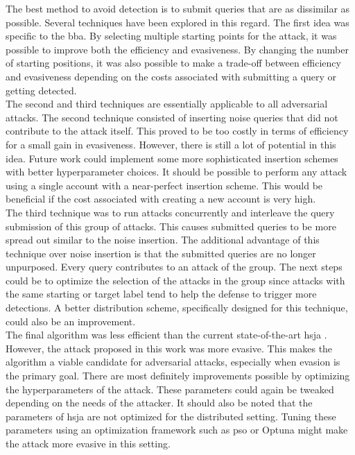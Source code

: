 The best method to avoid detection is to submit queries that are as dissimilar as possible. Several techniques have been explored in this regard. The first idea was specific to the \gls{bba}. By selecting multiple starting points for the attack, it was possible to improve both the efficiency and evasiveness. By changing the number of starting positions, it was also possible to make a trade-off between efficiency and evasiveness depending on the costs associated with submitting a query or getting detected.\\

The second and third techniques are essentially applicable to all adversarial attacks. The second technique consisted of inserting noise queries that did not contribute to the attack itself. This proved to be too costly in terms of efficiency for a small gain in evasiveness. However, there is still a lot of potential in this idea. Future work could implement some more sophisticated insertion schemes with better hyperparameter choices. It should be possible to perform any attack using a single account with a near-perfect insertion scheme. This would be beneficial if the cost associated with creating a new account is very high.\\

The third technique was to run attacks concurrently and interleave the query submission of this group of attacks. This causes submitted queries to be more spread out similar to the noise insertion. The additional advantage of this technique over noise insertion is that the submitted queries are no longer unpurposed. Every query contributes to an attack of the group. The next steps could be to optimize the selection of the attacks in the group since attacks with the same starting or target label tend to help the defense to trigger more detections. A better distribution scheme, specifically designed for this technique, could also be an improvement.\\

The final algorithm was less efficient than the current state-of-the-art \gls{hsja} \cite{hsja}. However, the attack proposed in this work was more evasive. This makes the algorithm a viable candidate for adversarial attacks, especially when evasion is the primary goal. There are most definitely improvements possible by optimizing the hyperparameters of the attack. These parameters could again be tweaked depending on the needs of the attacker. It should also be noted that the parameters of \gls{hsja} are not optimized for the distributed setting. Tuning these parameters using an optimization framework such as \gls{pso} or Optuna \cite{optuna} might make the attack more evasive in this setting.\\

